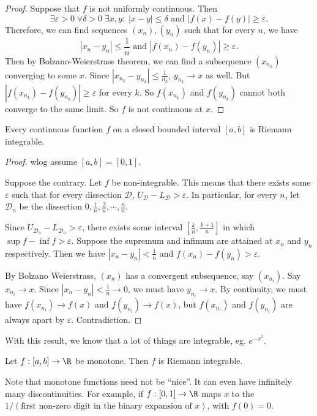 \documentclass[a4paper]{article}
\begin{document}
\begin{proof}
  Suppose that $f$ is not uniformly continuous. Then
  \[
    \exists \varepsilon >0\; \forall \delta > 0\; \exists x, y:\; |x - y| \leq \delta \text{ and }|f(x) - f(y)| \geq \varepsilon.
  \]
  Therefore, we can find sequences $(x_n), (y_n)$ such that for every $n$, we have
  \[
    |x_n - y_n| \leq \frac{1}{n}\text{ and }|f(x_n) - f(y_n)| \geq \varepsilon.
  \]
  Then by Bolzano-Weierstrass theorem, we can find a subsequence $(x_{n_k})$ converging to some $x$. Since $|x_{n_k} - y_{n_k}| \leq \frac{1}{n_k}$, $y_{n_k}\to x$ as well. But $|f(x_{n_k}) - f(y_{n_k})| \geq \varepsilon$ for every $k$. So $f(x_{n_k})$ and $f(y_{n_k})$ cannot both converge to the same limit. So $f$ is not continuous at $x$.
\end{proof}

\begin{thm}
  Every continuous function $f$ on a closed bounded interval $[a, b]$ is Riemann integrable.
\end{thm}

\begin{proof}
  wlog assume $[a, b] = [0, 1]$.

  Suppose the contrary. Let $f$ be non-integrable. This means that there exists some $\varepsilon$ such that for every dissection $\mathcal{D}$, $U_{\mathcal{D}} - L_{\mathcal{D}} > \varepsilon$. In particular, for every $n$, let $\mathcal{D}_n$ be the dissection $0, \frac{1}{n}, \frac{2}{n}, \cdots, \frac{n}{n}$.

  Since $U_{\mathcal{D}_n} - L_{\mathcal{D}_n} > \varepsilon$, there exists some interval $\left[\frac{k}{n}, \frac{k + 1}{n}\right]$ in which $\sup f - \inf f > \varepsilon$. Suppose the supremum and infimum are attained at $x_n$ and $y_n$ respectively. Then we have $|x_n - y_n| < \frac{1}{n}$ and $f(x_n) - f(y_n) > \varepsilon$.

  By Bolzano Weierstrass, $(x_n)$ has a convergent subsequence, say $(x_{n_i})$. Say $x_{n_i}\to x$. Since $|x_n - y_n| < \frac{1}{n}\to 0$, we must have $y_{n_i}\to x$. By continuity, we must have $f(x_{n_i}) \to f(x)$ and $f(y_{n_i}) \to f(x)$, but $f(x_{n_i})$ and $f(y_{n_i})$ are always apart by $\varepsilon$. Contradiction.
\end{proof}
With this result, we know that a lot of things are integrable, eg. $e^{-x^2}$.

\begin{thm}
  Let $f: [a, b] \to \R$ be monotone. Then $f$ is Riemann integrable.
\end{thm}
Note that monotone functions need not be ``nice''. It can even have infinitely many discontinuities. For example, if $f: [0, 1] \to \R$ maps $x$ to the $1/(\text{first non-zero digit in the binary expansion of }x)$, with $f(0) = 0$.
\end{document}
